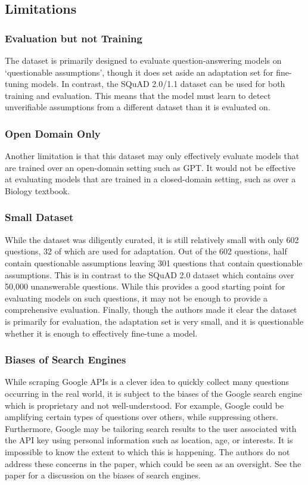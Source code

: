 \documentclass[letterpaper, 11pt]{article}
\begin{document}
\subsection{Limitations}
\subsubsection{Evaluation but not Training}
The dataset is primarily designed to evaluate question-answering models on `questionable assumptions', though it does set aside an adaptation set for fine-tuning models. In contrast, the SQuAD 2.0/1.1 dataset can be used for both training and evaluation.
This means that the model must learn to detect unverifiable assumptions from a different dataset than it is evaluated on. 

\subsubsection{Open Domain Only}
Another limitation is that this dataset may only effectively evaluate models that are trained over an open-domain setting such as GPT.
It would not be effective at evaluating models that are trained in a closed-domain setting, such as over a Biology textbook.

\subsubsection{Small Dataset}
While the dataset was diligently curated, it is still relatively small with only 602 questions, 32 of which are used for adaptation. 
Out of the 602 questions, half contain questionable assumptions leaving 301 questions that contain questionable assumptions.
This is in contrast to the SQuAD 2.0 dataset which contains over 50,000 unanswerable questions. While this provides a good starting point for evaluating models on such questions, it may not be enough to provide a comprehensive evaluation.
Finally, though the authors made it clear the dataset is primarily for evaluation, the adaptation set is very small, and it is questionable whether it is enough to effectively fine-tune a model.


\subsubsection{Biases of Search Engines}
While scraping Google APIs is a clever idea to quickly collect many questions occurring in the real world, it is subject to the biases of the Google search engine which is proprietary and not well-understood. For example, Google could be amplifying certain types of 
questions over others, while suppressing others. Furthermore, Google may be tailoring search results to the user associated with the API key using personal information such as location, age, or interests. It is impossible to know the extent to which this is happening.
The authors do not address these concerns in the paper, which could be seen as an oversight. 
See the \cite{Hao2020} paper for a discussion on the biases of search engines.
\end{document}

